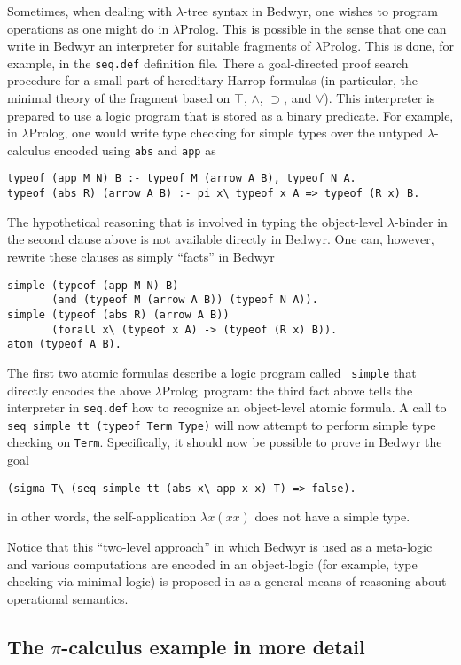 \documentclass{article}
\newcommand{\lp}{$\lambda$Prolog}
\begin{document}
Sometimes, when dealing with $\lambda$-tree syntax in Bedwyr, one
wishes to program operations as one might do in \lp.  This is possible
in the sense that one can write in Bedwyr an interpreter for suitable
fragments of \lp.  This is done, for example, in the {\tt seq.def}
definition file.  There a goal-directed proof search procedure for a
small part of hereditary Harrop formulas (in particular, the minimal
theory of the fragment based on $\top$, $\wedge$, $\supset$, and
$\forall$).  This interpreter is prepared to use a logic program that
is stored as a binary predicate.  For example, in \lp, one would write
type checking for simple types over the untyped $\lambda$-calculus
encoded using {\tt abs} and {\tt app} as
\begin{verbatim}
typeof (app M N) B :- typeof M (arrow A B), typeof N A.
typeof (abs R) (arrow A B) :- pi x\ typeof x A => typeof (R x) B.
\end{verbatim}
The hypothetical reasoning that is involved in typing the object-level
$\lambda$-binder in the second clause above is not available directly
in Bedwyr.  One can, however, rewrite these clauses as simply
``facts'' in Bedwyr
\begin{verbatim}
simple (typeof (app M N) B) 
       (and (typeof M (arrow A B)) (typeof N A)).
simple (typeof (abs R) (arrow A B)) 
       (forall x\ (typeof x A) -> (typeof (R x) B)).
atom (typeof A B).
\end{verbatim}
The first two atomic formulas describe a logic program called {\tt
simple} that directly encodes the above \lp\ program: the third fact
above tells the interpreter in {\tt seq.def} how to recognize an
object-level atomic formula.  A call to
\verb+seq simple tt (typeof Term Type)+ will now attempt to perform
simple type checking on {\tt Term}.  Specifically, it should now be
possible to prove in Bedwyr the goal
\begin{verbatim}
(sigma T\ (seq simple tt (abs x\ app x x) T) => false).
\end{verbatim}
in other words, the self-application $\lambda x(x x)$ does not have a
simple type.

Notice that this ``two-level approach'' in which Bedwyr is used as a
meta-logic and various computations are encoded in an object-logic
(for example, type checking via minimal logic) is proposed in
\cite{miller06ijcar} as a general means of reasoning about operational
semantics.

\subsection{The $\pi$-calculus example in more detail}
\label{pi-examples}
\end{document}
